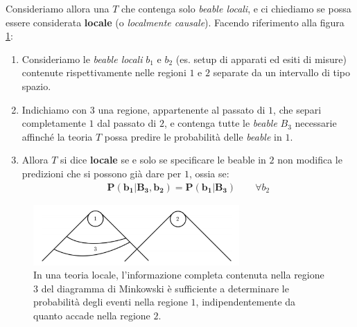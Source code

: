 \documentclass[../../InformazioneQuantistica.tex]{subfiles}
\begin{document}
\begin{expl}
Consideriamo allora una $T$ che contenga solo \textit{beable locali}, e ci chiediamo se possa essere considerata \textbf{locale} (o \textit{localmente causale}).
Facendo riferimento alla figura \ref{fig:Bell-locality}:
\begin{enumerate}
\item Consideriamo le \textit{beable locali} $b_1$ e $b_2$ (es. setup di apparati ed esiti di misure) contenute rispettivamente nelle regioni $1$ e $2$ separate da un intervallo di tipo spazio.
\item Indichiamo con $3$ una regione, appartenente al passato di $1$, che separi completamente $1$ dal passato di $2$, e contenga tutte le \textit{beable} $B_3$ necessarie affinché la teoria $T$ possa predire le probabilità delle \textit{beable} in $1$.
\item Allora $T$ si dice \textbf{locale} se e solo se specificare le beable in $2$ non modifica le predizioni che si possono già dare per $1$, ossia se:
\begin{align}
\bm{P(b_1|B_3, b_2) = P(b_1|B_3)} \qquad \forall b_2
\label{eqn:prob-locality}
\end{align}
\end{enumerate}
\begin{figure}[H]
\centering
\includegraphics[width=0.7\textwidth]{Immagini/28_3/minkowski1.png}
\caption{In una teoria locale, l'informazione completa contenuta nella regione $3$ del diagramma di Minkowski è sufficiente a determinare le probabilità degli eventi nella regione $1$, indipendentemente da quanto accade nella regione $2$.\label{fig:Bell-locality}}
\end{figure}


\end{expl}
\end{document}
